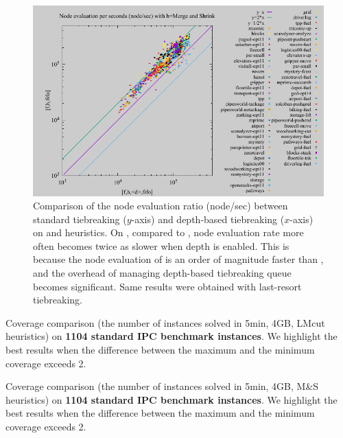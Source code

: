 \begin{figure}[htbp]
 \includegraphics{img/node-sec/mnhiF-mnh_F.pdf}
 \caption{Comparison of the node evaluation ratio (node/sec) between standard tiebreaking ($y$-axis) and
 depth-based tiebreaking ($x$-axis) on \lmcut and \mands heuristics. On \mands, compared to \lmcut, node evaluation rate more often becomes
 twice as slower when depth is enabled. This is because the node evaluation of \mands is an order of
 magnitude faster than \lmcut, and the overhead of managing depth-based tiebreaking queue becomes significant. Same results were obtained with \lifo last-resort tiebreaking. }
 \label{fig:expansion-ratio}
\end{figure}

\begin{table}[htbp]
 {
 \centering
 
  \caption{
 Coverage comparison (the number of instances solved in 5min, 4GB, LMcut
 heuristics) on \textbf{1104 standard IPC benchmark instances}. We highlight the
 best results when the difference between the maximum and the minimum coverage exceeds 2.
 }
 \label{tbl:lmcut-ipc-full}
 }
\end{table}

\begin{table}[htbp]
 {
 \centering
 
  \caption{
 Coverage comparison (the number of instances solved in 5min, 4GB, M\&S
 heuristics) on \textbf{1104 standard IPC benchmark instances}. We highlight the
 best results when the difference between the maximum and the minimum coverage exceeds 2.
 }
 \label{tbl:mands-ipc-full}
 }
\end{table}


